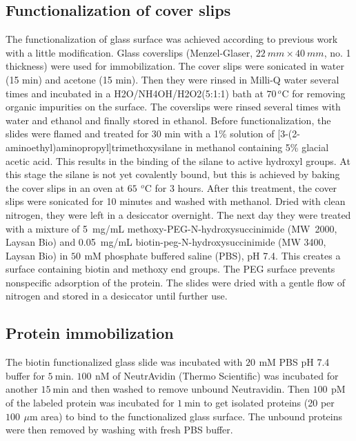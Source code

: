 \documentclass[journal=jacsat,manuscript=article]{achemso}
\newcommand{\um}{\ensuremath{\,\mu\textrm{m}}}
\newcommand{\mM}{\ensuremath{\,\textrm{mM}}}
\newcommand{\nM}{\ensuremath{\,\textrm{nM}}}
\newcommand{\pM}{\ensuremath{\,\textrm{pM}}}
\newcommand{\degree}{\ensuremath{\,^o\textrm{C}}}
\begin{document}
\subsection{Functionalization of cover slips}
The functionalization of glass surface was achieved according to previous work with a little modification.
\cite{gupta2012involvement} Glass coverslips (Menzel-Glaser, $22~mm \times 40~mm$, no. 1 thickness) were used for 
immobilization. The cover slips were sonicated in water (15 min) and acetone (15 min). Then they were rinsed in Milli-Q 
water several times and incubated in a H2O/NH4OH/H2O2(5:1:1) bath at $70\degree$ for removing organic impurities on the 
surface. The coverslips were rinsed several times with water and ethanol and finally stored in ethanol. Before 
functionalization, the slides were flamed and treated for 30 min with a 1\% solution of 
[3-(2-aminoethyl)aminopropyl]trimethoxysilane in methanol containing 5\% glacial acetic acid. This results in the 
binding of the silane to active hydroxyl groups. At this stage the silane is not yet covalently bound, but this is 
achieved by baking the cover slips in an oven at $65~\degree$ for 3 hours. After this treatment, the cover slips were 
sonicated for 10 minutes and washed with methanol. Dried with clean nitrogen, they were left in a desiccator overnight. 
The next day they were treated with a mixture of 5~mg/mL methoxy-PEG-N-hydroxysuccinimide (MW~2000, Laysan Bio) and 
0.05~mg/mL biotin-peg-N-hydroxysuccinimide (MW 3400, Laysan Bio) in $50~\mM$ phosphate buffered saline (PBS), pH 7.4. 
This creates a surface containing biotin and methoxy end groups. The PEG surface prevents nonspecific adsorption of the 
protein. The slides were dried with a gentle flow of nitrogen and stored in a desiccator until further use.
\subsection{Protein immobilization}
The biotin functionalized glass slide was incubated with $20~\mM$ PBS pH 7.4 buffer for $5~$min. $100~\nM$ of 
NeutrAvidin (Thermo Scientific) was incubated for another $15~$min and then washed to remove unbound Neutravidin. 
Then $100~\pM$ of the labeled protein was incubated for $1~$min to get isolated proteins (20 per $100~\um$ area) to 
bind to the functionalized glass surface. The unbound proteins were then removed by washing with fresh PBS buffer.
\end{document}
